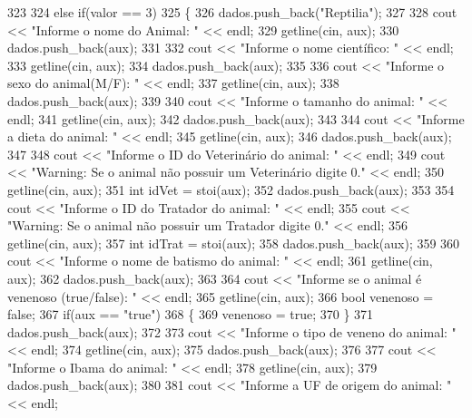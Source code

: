 \begin{DoxyCode}
323 
324     \textcolor{keywordflow}{else} \textcolor{keywordflow}{if}(valor == 3)
325     \{
326         dados.push\_back(\textcolor{stringliteral}{"Reptilia"});
327 
328         cout << \textcolor{stringliteral}{"Informe o nome do Animal: "} << endl;
329         getline(cin, aux);
330         dados.push\_back(aux);
331 
332         cout << \textcolor{stringliteral}{"Informe o nome científico:  "} << endl;
333         getline(cin, aux);
334         dados.push\_back(aux);
335 
336         cout << \textcolor{stringliteral}{"Informe o sexo do animal(M/F): "} << endl;
337         getline(cin, aux);
338         dados.push\_back(aux);
339 
340         cout << \textcolor{stringliteral}{"Informe o tamanho do animal: "} << endl;
341         getline(cin, aux);
342         dados.push\_back(aux);
343 
344         cout << \textcolor{stringliteral}{"Informe a dieta do animal: "} << endl;
345         getline(cin, aux);
346         dados.push\_back(aux);
347 
348         cout << \textcolor{stringliteral}{"Informe o ID do Veterinário do animal: "} << endl;
349         cout << \textcolor{stringliteral}{"Warning: Se o animal não possuir um Veterinário digite 0."} << endl;
350         getline(cin, aux);
351         \textcolor{keywordtype}{int} idVet = stoi(aux);
352         dados.push\_back(aux);
353 
354         cout << \textcolor{stringliteral}{"Informe o ID do Tratador do animal: "} << endl;
355         cout << \textcolor{stringliteral}{"Warning: Se o animal não possuir um Tratador digite 0."} << endl;
356         getline(cin, aux);
357         \textcolor{keywordtype}{int} idTrat = stoi(aux);
358         dados.push\_back(aux);
359 
360         cout << \textcolor{stringliteral}{"Informe o nome de batismo do animal: "} << endl;
361         getline(cin, aux);
362         dados.push\_back(aux);
363 
364         cout << \textcolor{stringliteral}{"Informe se o animal é venenoso (true/false): "} << endl;
365         getline(cin, aux);
366         \textcolor{keywordtype}{bool} venenoso = \textcolor{keyword}{false};
367         \textcolor{keywordflow}{if}(aux == \textcolor{stringliteral}{"true"})
368         \{
369             venenoso = \textcolor{keyword}{true};
370         \}
371         dados.push\_back(aux);
372 
373         cout << \textcolor{stringliteral}{"Informe o tipo de veneno do animal: "} << endl;
374         getline(cin, aux);
375         dados.push\_back(aux);
376 
377         cout << \textcolor{stringliteral}{"Informe o Ibama do animal: "} << endl;
378         getline(cin, aux);
379         dados.push\_back(aux);
380 
381         cout << \textcolor{stringliteral}{"Informe a UF de origem do animal: "} << endl;

\end{DoxyCode}
